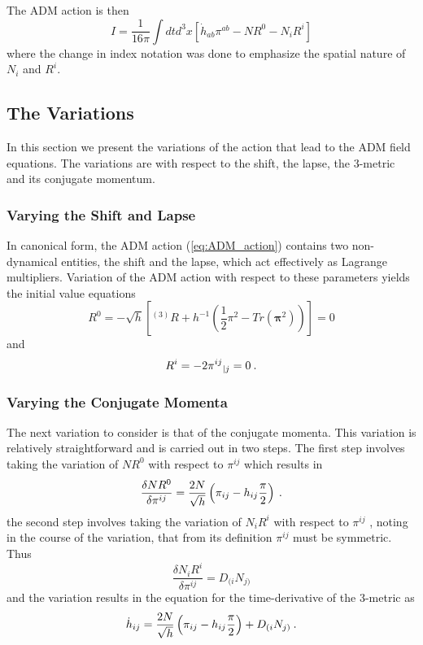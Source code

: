 The ADM action is then
\begin{equation}\label{eq:ADM_action}
   I = \frac{1}{16 \pi} \int dt d^3x \left[ {\dot h}_{ab} \pi^{ab}
                                            - N R^0 - N_i R^i \right]
\end{equation}
where the change in index notation was done to emphasize the spatial nature of
$N_i$ and $R^i$.


\subsection{The Variations}\label{SS:Variations}

In this section we present the variations of the action that lead to the
ADM field equations.  The variations are with respect to the shift, the lapse,
the 3-metric and its conjugate momentum.


\subsubsection{Varying the Shift and Lapse}

In canonical form, the ADM action (\ref{eq:ADM_action}) contains two non-
dynamical entities, the shift and the lapse, which act effectively as Lagrange
multipliers.  Variation of the ADM action with respect to these parameters
yields the initial value equations
\[
   R^0 = -\sqrt{h} \left[ {}^{(3)}R + h^{-1} \left( \frac{1}{2} {\pi}^2 -
                                                Tr \left( \mathbf{\pi}^2 \right)
                                             \right)
                   \right] = 0
\]
and
\[
   R^i = -2 {\pi^{ij}}_{|j} = 0 \: .
\]


\subsubsection{Varying the Conjugate Momenta}

The next variation to consider is that of the conjugate momenta.  This variation
is relatively straightforward and is carried out in two steps.  The first step
involves taking the variation of $N R^0$ with respect to $\pi^{ij}$ which results
in
\[
\frac{ \delta N R^0}{\delta \pi^{ij}} = \frac{2 N}{\sqrt{h}}
                                      \left(
                                        \pi_{ij} - h_{ij} \frac{\pi}{2}
                                      \right) \: .
\]
the second step involves taking the variation of $N_i R^i$ with respect to $\pi^{ij}$
, noting in the course of the variation, that from its definition $\pi^{ij}$ must
be symmetric.  Thus
\[
   \frac{\delta N_i R^i}{\delta \pi^{ij}} = D_{(i} N_{j)}
\]
and the variation results in the equation for the time-derivative of the 3-metric
as
\[
   {\dot h}_{ij} = \frac{2 N}{\sqrt{h}} \left( \pi_{ij} - h_{ij} \frac{\pi}{2}
                                        \right) + D_{(i} N_{j)} \: .
\]
